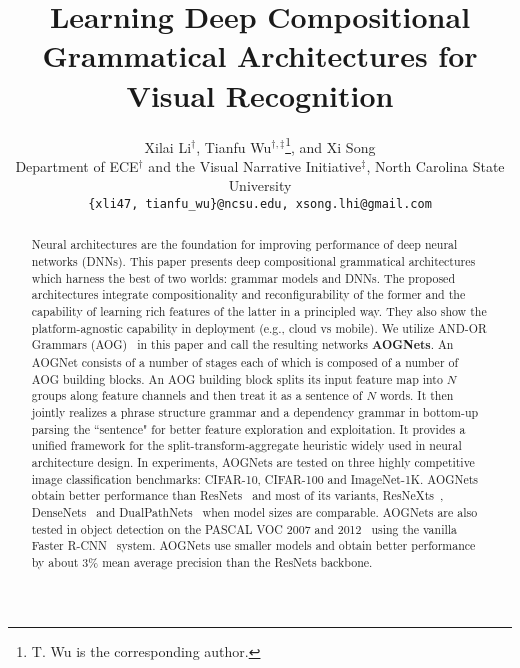 \documentclass[10pt,twocolumn,letterpaper]{article}
\begin{document}
\setlength{\textfloatsep}{6pt}

\title{Learning Deep Compositional Grammatical Architectures for Visual Recognition}

\author{Xilai Li$^\dagger$, Tianfu Wu$^{\dagger,\ddagger}$\thanks{T. Wu is the corresponding author.}, and Xi Song\\
Department of ECE$^\dagger$ and the Visual Narrative Initiative$^\ddagger$, 
North Carolina State University\\
{\tt\small \{xli47, tianfu\_wu\}@ncsu.edu, xsong.lhi@gmail.com}
}

\maketitle

\begin{abstract}
    Neural architectures are the foundation for improving performance of deep neural networks (DNNs). This paper presents deep compositional grammatical architectures which harness the best of two worlds: grammar models and DNNs. The proposed architectures integrate compositionality and reconfigurability of the former and the capability of learning rich features of the latter in a principled way. They also show the platform-agnostic capability in deployment (e.g., cloud vs mobile).  We utilize AND-OR Grammars (AOG)~\cite{DisAOT-CVPR,Zhu_Grammar,Yuille_AndOr} in this paper and call the resulting networks \textbf{AOGNets}. An AOGNet consists of a number of stages each of which is composed of a number of AOG building blocks. An AOG building block splits its input feature map into $N$ groups along feature channels and then treat it as a sentence of $N$ words. It then jointly realizes a phrase structure grammar and a dependency grammar in bottom-up parsing the ``sentence" for better feature exploration and exploitation. It provides a unified framework for the  split-transform-aggregate heuristic widely used in neural architecture design. In experiments, AOGNets are tested on three highly competitive image classification benchmarks: CIFAR-10, CIFAR-100 and ImageNet-1K. AOGNets obtain better performance than ResNets~\cite{ResidualNet} and most of its variants, ResNeXts~\cite{ResNeXt}, DenseNets~\cite{DenseNet} and DualPathNets~\cite{DPN} when model sizes are comparable. AOGNets are also tested in object detection on the PASCAL VOC 2007 and 2012~\cite{VOC} using the vanilla Faster R-CNN~\cite{FasterRCNN} system. AOGNets use smaller models and obtain better performance by about $3\%$ mean average precision than the ResNets backbone. 
\end{abstract}
\end{document}
